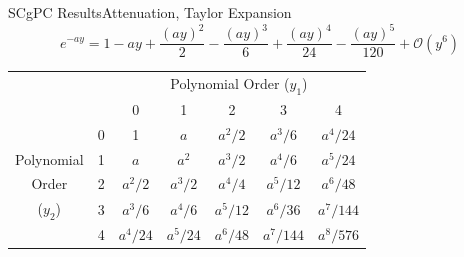 \documentclass{beamer}
\begin{document}
\begin{frame}{SCgPC Results}{Attenuation, Taylor Expansion}%
  \begin{equation*}
    e^{-ay} = 1 - ay + \frac{(ay)^2}{2} - \frac{(ay)^3}{6} + \frac{(ay)^4}{24} - \frac{(ay)^5}{120} +
          \mathcal{O}(y^6)
  \end{equation*}
\begin{table}
  \centering
  \begin{tabular}{|c c|c c c c c|}
    \cline{3-7}\multicolumn{2}{c|}{ } & \multicolumn{5}{c|}{Polynomial Order ($y_1$)} \\
               \multicolumn{2}{c|}{ } & 0 & 1 & 2 & 3 & 4 \\
    \hline & 0 & 1        & $a$      & $a^2/2$  & $a^3/6$   & \cellcolor{Gray6}$a^4/24$  \\
Polynomial & 1 & $a$      & $a^2   $ & $a^3/2 $ & \cellcolor{Gray6}$a^4/6  $ & $a^5/24 $ \\
Order      & 2 & $a^2/2$  & $a^3/2 $ & \cellcolor{Gray6}$a^4/4 $ & $a^5/12 $ & $a^6/48 $ \\
($y_2$)    & 3 & $a^3/ 6$ & \cellcolor{Gray6}$a^4/ 6$ & $a^5/12$ & $a^6/ 36$ & $a^7/144$ \\
           & 4 & \cellcolor{Gray6}$a^4/24$ & $a^5/24$ & $a^6/48$ & $a^7/144$ & $a^8/576$ \\
    \hline
  \end{tabular}
\end{table}
\end{frame}
\end{document}
